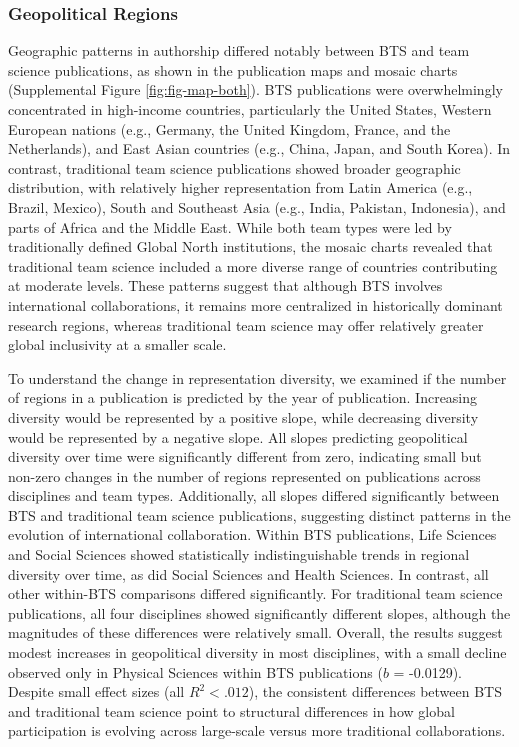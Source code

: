 \documentclass[
  man,floatsintext]{apa7}
\begin{document}
\subsubsection{Geopolitical Regions}\label{geopolitical-regions}

Geographic patterns in authorship differed notably between BTS and team
science publications, as shown in the publication maps and mosaic charts
(Supplemental Figure \ref{fig:fig-map-both}). BTS publications were overwhelmingly
concentrated in high-income countries, particularly the United States,
Western European nations (e.g., Germany, the United Kingdom, France, and
the Netherlands), and East Asian countries (e.g., China, Japan, and
South Korea). In contrast, traditional team science publications showed broader
geographic distribution, with relatively higher representation from
Latin America (e.g., Brazil, Mexico), South and Southeast Asia (e.g.,
India, Pakistan, Indonesia), and parts of Africa and the Middle East.
While both team types were led by traditionally defined Global North
institutions, the mosaic charts revealed that traditional team science
included a more diverse range of countries contributing at moderate
levels. These patterns suggest that although BTS involves international
collaborations, it remains more centralized in historically dominant
research regions, whereas traditional team science may offer relatively greater
global inclusivity at a smaller scale.

To understand the change in representation diversity, we examined if the
number of regions in a publication is predicted by the year of
publication. Increasing diversity would be represented by a positive
slope, while decreasing diversity would be represented by a negative
slope. All slopes predicting geopolitical diversity over time were
significantly different from zero, indicating small but non-zero changes
in the number of regions represented on publications across disciplines
and team types. Additionally, all slopes differed significantly between
BTS and traditional team science publications, suggesting distinct patterns in the
evolution of international collaboration. Within BTS publications, Life
Sciences and Social Sciences showed statistically indistinguishable
trends in regional diversity over time, as did Social Sciences and
Health Sciences. In contrast, all other within-BTS comparisons differed
significantly. For traditional team science publications, all four disciplines
showed significantly different slopes, although the magnitudes of these
differences were relatively small. Overall, the results suggest modest
increases in geopolitical diversity in most disciplines, with a small
decline observed only in Physical Sciences within BTS publications (\(b\)
= -0.0129). Despite small effect sizes (all \(R^2 < .012\)), the
consistent differences between BTS and traditional team science point to
structural differences in how global participation is evolving across
large-scale versus more traditional collaborations.
\end{document}
